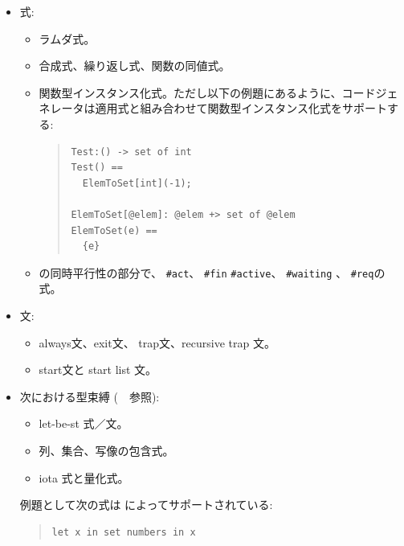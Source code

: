 \documentclass[\pformat,12pt]{jarticle}
\begin{document}
\begin{itemize}

\item 式:

  \begin{itemize}
  \item ラムダ式。
  \item 合成式、繰り返し式、関数の同値式。
  \item 関数型インスタンス化式。ただし以下の例題にあるように、コードジェネレータは適用式と組み合わせて関数型インスタンス化式をサポートする:

\begin{quote}
\begin{verbatim}
Test:() -> set of int
Test() ==
  ElemToSet[int](-1);

ElemToSet[@elem]: @elem +> set of @elem
ElemToSet(e) ==
  {e}
\end{verbatim}
\end{quote}

\item  \VDM{}の同時平行性の部分で、 {\tt \#act}、 {\tt \#fin} {\tt \#active}、 {\tt \#waiting} 、 {\tt \#req}の式。

  \end{itemize}

\item 文: 

  \begin{itemize}
  \item always文、exit文、 trap文、recursive trap 文。
  \item start文と start list 文。
  \end{itemize}

\item 次における型束縛 (\langmancite　参照):

  \begin{itemize}
  \item let-be-st 式／文。
  \item 列、集合、写像の包含式。
  \item iota 式と量化式。
  \end{itemize}

例題として次の式は \tcg によってサポートされている:


\begin{quote}
\begin{verbatim}
let x in set numbers in x
\end{verbatim}
\end{quote}


\end{itemize}
\end{document}
